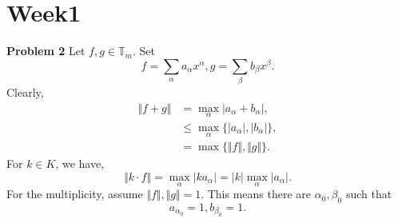 \documentclass[10pt]{article}
\numberwithin{equation}{section}
\newcommand{\norm}[1]{\Vert #1 \Vert}
\newcommand{\T}[0]{\mathbb{T}}
\begin{document}
\section{Week1}
\par\textbf{Problem 2}
Let $f,g\in\T_m$. Set
\begin{equation*}
  f = \sum_{\alpha}a_\alpha x^\alpha,g=\sum_\beta b_\beta x^\beta.
\end{equation*}
Clearly,
\begin{align*}
  \norm{f+g} & = \max_{\alpha} \vert a_\alpha+b_\alpha\vert,\\
  & \leq \max_\alpha\{\vert a_\alpha\vert,\vert b_\alpha\vert\},\\
  & = \max\{\norm{f},\norm{g}\}.
\end{align*}
For $k\in K$, we have,
\begin{equation*}
  \norm{k\cdot f} = \max_\alpha\vert k a_\alpha\vert  = \vert k\vert \max_\alpha\vert a_\alpha\vert.
\end{equation*}
For the multiplicity, assume $\norm{f},\norm{g} = 1$. This means there are $\alpha_0,\beta_0$ such that 
\begin{equation*}
  a_{\alpha_0} = 1,b_{\beta_0} = 1.
\end{equation*}
\end{document}
